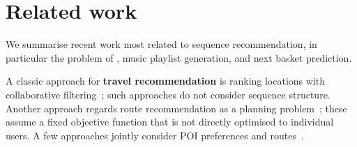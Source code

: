 




\section{Related work}
\label{sec:related}


We summarise recent work most related to sequence recommendation, 
in particular the problem of \trajrec, music playlist generation, 
and next basket prediction.


A classic approach for {\bf travel recommendation} is ranking locations with 
collaborative filtering~\cite{zhang2015location,ijcai13};
such approaches do not consider sequence structure.
Another approach regards route recommendation as a planning problem~\cite{brilhante2013shall,gioniswsdm14,ijcai15};
these assume a fixed objective function that is not directly optimised to individual users. 
A few approaches jointly consider POI preferences and 
routes~\cite{chen2015tripplanner,cikm16paper}.

